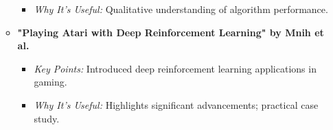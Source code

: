 \documentclass[aspectratio=169]{beamer}
\begin{document}
\begin{frame}[fragile]
\begin{itemize}
\begin{itemize}
\begin{itemize}
                        \item \textit{Why It’s Useful:} Qualitative understanding of algorithm performance.
                    \end{itemize}
                \item \textbf{"Playing Atari with Deep Reinforcement Learning" by Mnih et al.}
                    \begin{itemize}
                        \item \textit{Key Points:} Introduced deep reinforcement learning applications in gaming.
                        \item \textit{Why It’s Useful:} Highlights significant advancements; practical case study.
                    \end{itemize}
            \end{itemize}
    \end{itemize}
\end{frame}
\end{document}
